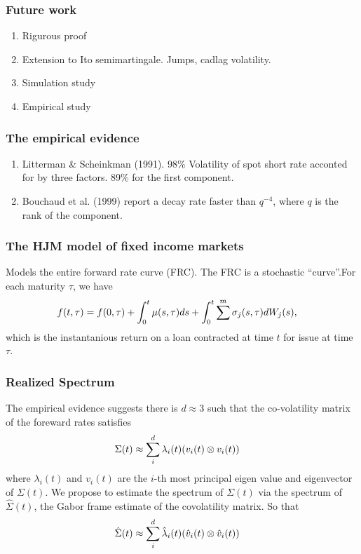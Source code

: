 \documentclass[fleqn]{beamer}
\begin{document}
\begin{frame}
  \frametitle{Future work}
  \begin{enumerate}
    \item Rigurous proof 
    \item Extension to Ito semimartingale. Jumps, cadlag volatility.
    \item Simulation study
    \item Empirical study
  \end{enumerate}
\end{frame}
\begin{frame}
  \frametitle{The empirical evidence}
  \begin{enumerate}
    \item 
  Litterman \& Scheinkman (1991). 98\% Volatility of spot short rate acconted for by three factors. 89\% for the first component. 
\item Bouchaud et al. (1999) report a decay rate faster than $q^{-4}$, where $q$ is the rank of the component.
  \end{enumerate}
\end{frame}
\begin{frame}
  \frametitle{The HJM model of fixed income markets}
  Models the entire forward rate curve (FRC). The FRC is a stochastic ``curve''.For each maturity $\tau$, we have
  \begin{align}
    &f(t, \tau) = f(0, \tau) + \int^t_0\mu(s,\tau) d s + \int^t_0\sum^m\sigma_j(s,\tau)d W_j(s),\notag
    \label{}
  \end{align}
which is the instantanious return on a loan contracted at time $t$ for issue at time $\tau$. 
\end{frame}
\begin{frame}
  \frametitle{Realized Spectrum}
  The empirical evidence suggests there is $d \approx 3$ such  that  the co-volatility matrix of the foreward rates satisfies
  \begin{align}
    &\Sigma(t) \approx \sum^d_i \lambda_i(t) (v_i(t) \otimes v_i(t))
    \notag
    \label{}
  \end{align}
 where $\lambda_i(t)$ and $v_i(t)$ are the $i$-th most principal eigen value and eigenvector of $\Sigma(t)$. 
 We propose to estimate the spectrum of $\Sigma(t)$ via the spectrum of $\hat{\Sigma}(t)$, the Gabor frame estimate of the covolatility matrix. So that
 \begin{align}
   &\hat{\Sigma}(t) \approx \sum^d_i \hat{\lambda}_i(t) (\hat{v}_i(t) \otimes \hat{v}_i(t))
    \notag
    \label{}
  \end{align}
\end{frame}
\end{document}
